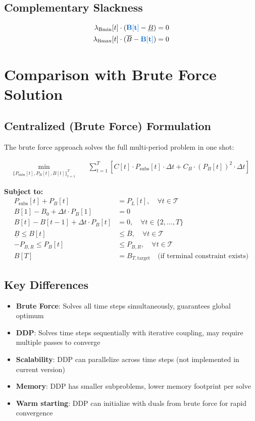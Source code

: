 \documentclass[11pt]{article}
\newcommand{\blueB}[1]{\textcolor{bluevar}{\mathbf{#1}}}      %
\begin{document}
\subsection{Complementary Slackness}
\begin{align}
\lambda_{\text{Bmin}}[t] \cdot (\blueB{B[t]} - \underline{B}) &= 0 \\
\lambda_{\text{Bmax}}[t] \cdot (\overline{B} - \blueB{B[t]}) &= 0
\end{align}

\section{Comparison with Brute Force Solution}

\subsection{Centralized (Brute Force) Formulation}
The brute force approach solves the full multi-period problem in one shot:

\begin{align}
\min_{\{P_{\text{subs}}[t], P_B[t], B[t]\}_{t=1}^T} \quad & \sum_{t=1}^T \left[ C[t] \cdot P_{\text{subs}}[t] \cdot \Delta t + C_B \cdot (P_B[t])^2 \cdot \Delta t \right]
\end{align}

\textbf{Subject to:}
\begin{align}
P_{\text{subs}}[t] + P_B[t] &= P_L[t], \quad \forall t \in \mathcal{T} \\
B[1] - B_0 + \Delta t \cdot P_B[1] &= 0 \\
B[t] - B[t-1] + \Delta t \cdot P_B[t] &= 0, \quad \forall t \in \{2, \ldots, T\} \\
\underline{B} \leq B[t] &\leq \overline{B}, \quad \forall t \in \mathcal{T} \\
-P_{B,R} \leq P_B[t] &\leq P_{B,R}, \quad \forall t \in \mathcal{T} \\
B[T] &= B_{T,\text{target}} \quad \text{(if terminal constraint exists)}
\end{align}

\subsection{Key Differences}
\begin{itemize}
    \item \textbf{Brute Force}: Solves all time steps simultaneously, guarantees global optimum
    \item \textbf{DDP}: Solves time steps sequentially with iterative coupling, may require multiple passes to converge
    \item \textbf{Scalability}: DDP can parallelize across time steps (not implemented in current version)
    \item \textbf{Memory}: DDP has smaller subproblems, lower memory footprint per solve
    \item \textbf{Warm starting}: DDP can initialize with duals from brute force for rapid convergence
\end{itemize}
\end{document}
